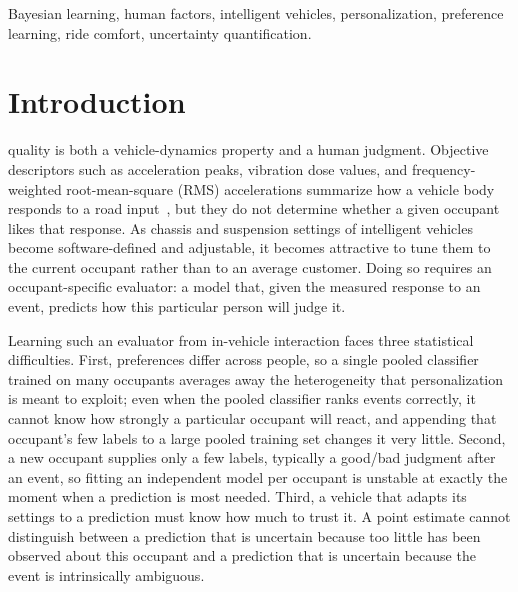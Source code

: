 \documentclass[lettersize,journal]{IEEEtran}
\begin{document}
\begin{IEEEkeywords}
Bayesian learning, human factors, intelligent vehicles, personalization, preference learning, ride comfort, uncertainty quantification.
\end{IEEEkeywords}

\section{Introduction}
\label{sec:introduction}

 quality is both a vehicle-dynamics property and a human judgment. Objective descriptors such as acceleration peaks, vibration dose values, and frequency-weighted root-mean-square (RMS) accelerations summarize how a vehicle body responds to a road input~\cite{iso2631,guastadisegni2024ride}, but they do not determine whether a given occupant likes that response. As chassis and suspension settings of intelligent vehicles become software-defined and adjustable, it becomes attractive to tune them to the current occupant rather than to an average customer. Doing so requires an occupant-specific evaluator: a model that, given the measured response to an event, predicts how this particular person will judge it.

Learning such an evaluator from in-vehicle interaction faces three statistical difficulties. First, preferences differ across people, so a single pooled classifier trained on many occupants averages away the heterogeneity that personalization is meant to exploit; even when the pooled classifier ranks events correctly, it cannot know how strongly a particular occupant will react, and appending that occupant's few labels to a large pooled training set changes it very little. Second, a new occupant supplies only a few labels, typically a good/bad judgment after an event, so fitting an independent model per occupant is unstable at exactly the moment when a prediction is most needed. Third, a vehicle that adapts its settings to a prediction must know how much to trust it. A point estimate cannot distinguish between a prediction that is uncertain because too little has been observed about this occupant and a prediction that is uncertain because the event is intrinsically ambiguous.
\end{document}
